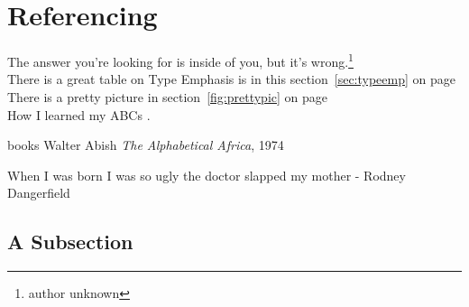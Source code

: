 \documentclass[a4paper,12pt]{book}
\begin{document}

\section{Referencing}

The answer you're looking for is inside of you, but it's wrong.\footnote[2]{author unknown} \\[2pt]

There is a great table on Type Emphasis is in this section~\ref{sec:typeemp} on page~\pageref{sec:typeemp}\\[2pt]
There is a pretty picture in section~\ref{fig:prettypic} on page~\pageref{fig:prettypic}\\[2pt]

How I learned my ABCs \cite{ABCAFR}. 

\begin{thebibliography} {books}
 Walter Abish \emph{The Alphabetical Africa}, 1974
\end{thebibliography}

When I was born I was so ugly the doctor slapped my mother - {Rodney Dangerfield} \\[2pt]
\blindtext
\subsection{A Subsection}

\blindtext

\clearpage

\printindex
\end{document}
